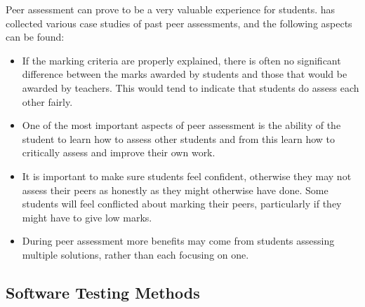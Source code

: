 \documentclass[sigplan,10pt,review]{acmart}\settopmatter{printfolios=true}
\begin{document}
Peer assessment can prove to be a very valuable experience for
students. \citet{falchikov_improving_2013} has collected various case
studies of past peer assessments, and the following aspects can be
found:
\begin{itemize}
\item If the marking criteria are properly explained, there is often
  no significant difference between the marks awarded by students and
  those that would be awarded by teachers. This would tend to indicate
  that students do assess each other fairly.
\item One of the most important aspects of peer assessment is the
  ability of the student to learn how to assess other students and
  from this learn how to critically assess and improve their own work.
\item It is important to make sure students feel confident, otherwise
  they may not assess their peers as honestly as they might otherwise
  have done. Some students will feel conflicted about marking their
  peers, particularly if they might have to give low marks.
\item During peer assessment more benefits may come from students
  assessing multiple solutions, rather than each focusing on one.
\end{itemize}



\subsection{Software Testing Methods}
\label{sec:background-testing}
\end{document}
